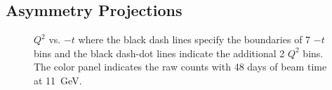 \subsection{Asymmetry Projections}

\begin{figure}[!ht]
 \begin{center}
   \caption[$Q^{2}$ vs. $-t$]{\footnotesize{$Q^{2}$ vs. $-t$ where the black
dash lines specify the boundaries of 7 $-t$ bins and the black dash-dot lines
indicate the additional 2 $Q^{2}$ bins.  The color panel indicates the raw
counts with 48 days of beam time at 11~GeV.}}
  \label{Q2_t_bin}
  \end{center}
\end{figure}

